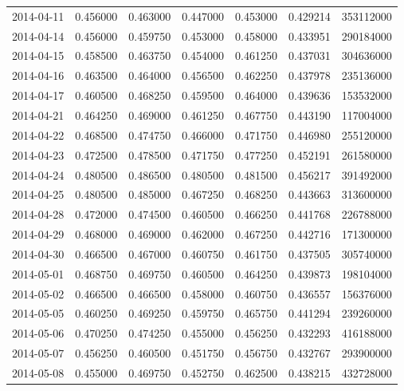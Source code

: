 \begin{tabular}{lrrrrrr}
2014-04-11 &    0.456000 &    0.463000 &    0.447000 &    0.453000 &    0.429214 &   353112000 \\
2014-04-14 &    0.456000 &    0.459750 &    0.453000 &    0.458000 &    0.433951 &   290184000 \\
2014-04-15 &    0.458500 &    0.463750 &    0.454000 &    0.461250 &    0.437031 &   304636000 \\
2014-04-16 &    0.463500 &    0.464000 &    0.456500 &    0.462250 &    0.437978 &   235136000 \\
2014-04-17 &    0.460500 &    0.468250 &    0.459500 &    0.464000 &    0.439636 &   153532000 \\
2014-04-21 &    0.464250 &    0.469000 &    0.461250 &    0.467750 &    0.443190 &   117004000 \\
2014-04-22 &    0.468500 &    0.474750 &    0.466000 &    0.471750 &    0.446980 &   255120000 \\
2014-04-23 &    0.472500 &    0.478500 &    0.471750 &    0.477250 &    0.452191 &   261580000 \\
2014-04-24 &    0.480500 &    0.486500 &    0.480500 &    0.481500 &    0.456217 &   391492000 \\
2014-04-25 &    0.480500 &    0.485000 &    0.467250 &    0.468250 &    0.443663 &   313600000 \\
2014-04-28 &    0.472000 &    0.474500 &    0.460500 &    0.466250 &    0.441768 &   226788000 \\
2014-04-29 &    0.468000 &    0.469000 &    0.462000 &    0.467250 &    0.442716 &   171300000 \\
2014-04-30 &    0.466500 &    0.467000 &    0.460750 &    0.461750 &    0.437505 &   305740000 \\
2014-05-01 &    0.468750 &    0.469750 &    0.460500 &    0.464250 &    0.439873 &   198104000 \\
2014-05-02 &    0.466500 &    0.466500 &    0.458000 &    0.460750 &    0.436557 &   156376000 \\
2014-05-05 &    0.460250 &    0.469250 &    0.459750 &    0.465750 &    0.441294 &   239260000 \\
2014-05-06 &    0.470250 &    0.474250 &    0.455000 &    0.456250 &    0.432293 &   416188000 \\
2014-05-07 &    0.456250 &    0.460500 &    0.451750 &    0.456750 &    0.432767 &   293900000 \\
2014-05-08 &    0.455000 &    0.469750 &    0.452750 &    0.462500 &    0.438215 &   432728000 \\

\end{tabular}
